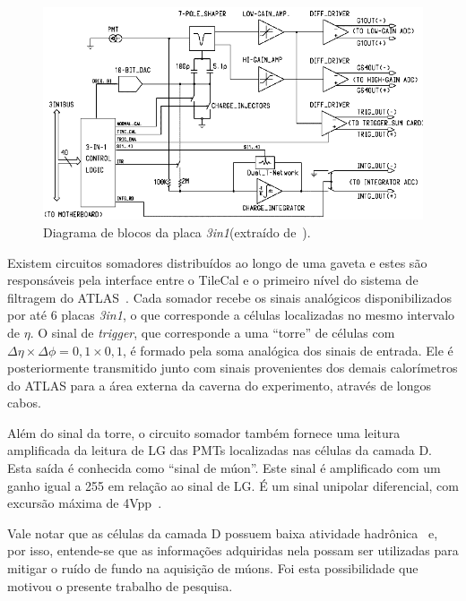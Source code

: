 \begin{figure}[htpb!]
    \centering
    \includegraphics[width=\textwidth]{images/3in1.png}
    \caption[Diagrama de blocos da placa \emph{3in1}]{Diagrama de blocos da
    placa \emph{3in1}(extraído
    de~\cite{ANDERSON2005}).}
    \label{fig:3in1}
\end{figure}

Existem circuitos somadores distribuídos ao longo de uma gaveta e estes são
responsáveis pela interface entre o TileCal e o primeiro nível do sistema de
filtragem do ATLAS~\cite{CERQUEIRA2007}. Cada somador recebe os sinais
analógicos disponibilizados por até 6 placas \emph{3in1}, o que  corresponde a
células localizadas no mesmo intervalo de $\eta$. O sinal de \emph{trigger},
que corresponde a uma ``torre'' de células com  $\Delta\eta \times \Delta\phi =
0,1 \times 0,1$, é formado pela soma analógica dos sinais de entrada. Ele é
posteriormente transmitido junto com  sinais provenientes dos demais
calorímetros do ATLAS para a área externa da caverna do experimento, através de
longos cabos.

Além do sinal da torre, o circuito somador também fornece uma leitura
amplificada da leitura de LG das PMTs localizadas nas células da camada D. Esta
saída é conhecida como ``sinal de múon''. Este sinal é amplificado com um
ganho igual a 255 em relação ao sinal de LG. É um sinal unipolar diferencial,
com excursão máxima de 4Vpp~\cite{CERQUEIRA2007}.

Vale notar que as células da camada D possuem baixa atividade
hadrônica~\cite{CIODARO2009} e, por isso, entende-se que as informações
adquiridas nela  possam ser utilizadas para mitigar o ruído de fundo na
aquisição de múons. Foi esta possibilidade que motivou o presente trabalho de
pesquisa.



